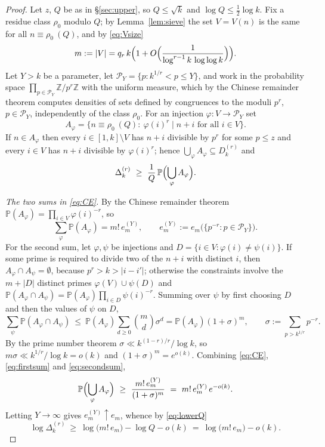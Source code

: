 \documentclass[11pt,reqno]{amsart}
\theoremstyle{plain}
\theoremstyle{definition}
\numberwithin{equation}{section}
\newcommand{\Z}{\mathbb{Z}}
\begin{document}
\begin{proof}
Let $z$, $Q$ be as in \S\ref{sec:upper}, so $Q\le\sqrt k$ and $\log Q\le\frac12\log k$.
Fix a residue class $\rho_0$ modulo $Q$; by Lemma~\ref{lem:sieve} the set $V=V(n)$ is the
same for all $n\equiv\rho_0\ (Q)$, and by \eqref{eq:Vsize}
\begin{equation}\label{eq:m-lower}
  m:=|V|=q_r\,k\Bigl(1+O\Bigl(\frac1{\log^{r-1}k\,\log\log k}\Bigr)\Bigr).
\end{equation}
Let $Y>k$ be a parameter, let $\mathcal P_Y=\{p:k^{1/r}<p\le Y\}$, and work in the
probability space $\prod_{p\in\mathcal P_Y}\Z/p^{r}\Z$ with the uniform measure, which by
the Chinese remainder theorem computes densities of sets defined by congruences to the
moduli $p^{r}$, $p\in\mathcal P_Y$, independently of the class $\rho_0$. For an injection
$\varphi:V\to\mathcal P_Y$ set
\[
  A_\varphi=\{n\equiv\rho_0\ (Q):\ \varphi(i)^{r}\mid n+i\text{ for all }i\in V\}.
\]
If $n\in A_\varphi$ then every $i\in[1,k]\setminus V$ has $n+i$ divisible by $p^{r}$ for
some $p\le z$ and every $i\in V$ has $n+i$ divisible by $\varphi(i)^{r}$; hence
$\bigcup_\varphi A_\varphi\subseteq D^{(r)}_k$ and
\begin{equation}\label{eq:lowerQ}
  \Delta^{(r)}_k\ \ge\ \frac1Q\,\mathbb P\Bigl(\bigcup_\varphi A_\varphi\Bigr).
\end{equation}

\emph{The two sums in \eqref{eq:CE}.}
By the Chinese remainder theorem $\mathbb P(A_\varphi)=\prod_{i\in V}\varphi(i)^{-r}$, so
\begin{equation}\label{eq:firstsum}
  \sum_\varphi\mathbb P(A_\varphi)=m!\,e_m^{(Y)},\qquad
  e^{(Y)}_m:=e_m\bigl(\{p^{-r}:p\in\mathcal P_Y\}\bigr).
\end{equation}
For the second sum, let $\varphi,\psi$ be injections and $D=\{i\in V:\varphi(i)\ne\psi(i)\}$.
If some prime is required to divide two of the $n+i$ with distinct $i$, then
$A_\varphi\cap A_\psi=\emptyset$, because $p^{r}>k>|i-i'|$; otherwise the constraints
involve the $m+|D|$ distinct primes $\varphi(V)\cup\psi(D)$ and
$\mathbb P(A_\varphi\cap A_\psi)=\mathbb P(A_\varphi)\prod_{i\in D}\psi(i)^{-r}$. Summing
over $\psi$ by first choosing $D$ and then the values of $\psi$ on $D$,
\begin{equation}\label{eq:secondsum}
  \sum_\psi\mathbb P(A_\varphi\cap A_\psi)\ \le\ \mathbb P(A_\varphi)
  \sum_{d\ge0}\binom{m}{d}\sigma^{d}=\mathbb P(A_\varphi)(1+\sigma)^{m},
  \qquad\sigma:=\sum_{p>k^{1/r}}p^{-r}.
\end{equation}
By the prime number theorem $\sigma\ll k^{(1-r)/r}/\log k$, so
$m\sigma\ll k^{1/r}/\log k=o(k)$ and $(1+\sigma)^{m}=e^{o(k)}$. Combining
\eqref{eq:CE}, \eqref{eq:firstsum} and \eqref{eq:secondsum},
\[
  \mathbb P\Bigl(\bigcup_\varphi A_\varphi\Bigr)\ \ge\
  \frac{m!\,e^{(Y)}_m}{(1+\sigma)^{m}}\ =\ m!\,e^{(Y)}_m\,e^{-o(k)} .
\]
Letting $Y\to\infty$ gives $e^{(Y)}_m\uparrow e_m$, whence by \eqref{eq:lowerQ}
\begin{equation}\label{eq:lower-reduction}
  \log\Delta^{(r)}_k\ \ge\ \log\bigl(m!\,e_m\bigr)-\log Q-o(k)
  \ =\ \log\bigl(m!\,e_m\bigr)-o(k).
\end{equation}


\end{proof}
\end{document}
